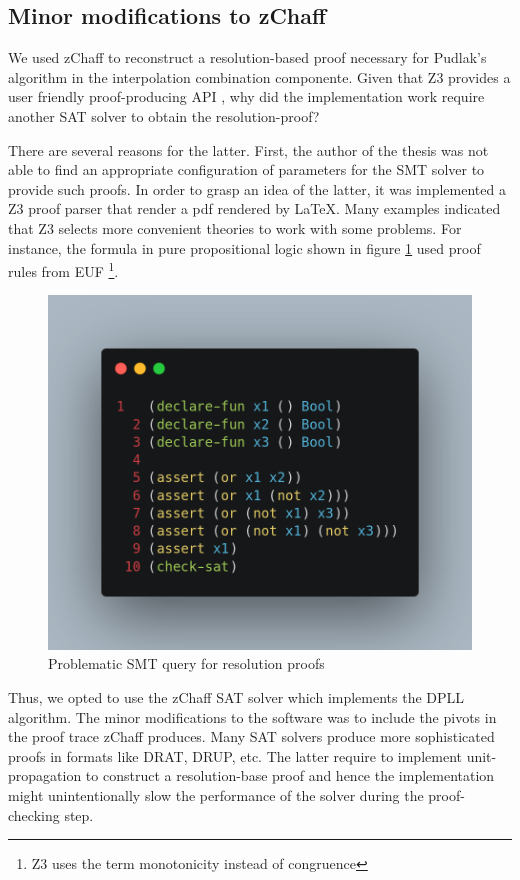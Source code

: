 \subsection{Minor modifications to zChaff}

We used zChaff to reconstruct a resolution-based proof necessary 
for Pudlak's algorithm in the interpolation combination componente. 
Given that Z3 provides a user friendly proof-producing API
\cite{Moura_proofsand}, why did the implementation
work require another SAT solver to obtain the resolution-proof?

There are several reasons for the latter. First, the author of the
thesis was not able to find an appropriate configuration of parameters
for the SMT solver to provide such proofs. In order to grasp an idea
of the latter, it was implemented a Z3 proof parser that render
a pdf rendered by \LaTeX. Many examples indicated that
Z3 selects more convenient theories to work with some problems. For
instance, the formula in pure propositional logic shown in figure 
\ref{query_proof_problem} used proof rules from EUF \footnote{Z3 uses
the term monotonicity instead of congruence}.

%


\begin{figure}
\centering
\includegraphics[scale=0.2]{query_screenshot}
\caption{Problematic SMT query for resolution proofs} \label{query_proof_problem}
\end{figure}

Thus, we opted to use the zChaff SAT solver which implements the DPLL algorithm. 
The minor modifications to the software was to include the pivots 
in the proof trace zChaff produces. Many SAT solvers produce more sophisticated 
proofs in formats like DRAT, DRUP, etc. The latter require to implement unit-propagation
to construct a resolution-base proof and hence the implementation might unintentionally
slow the performance of the solver during the proof-checking step.

